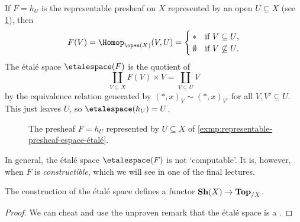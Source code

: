 \begin{exmp}\label{exmp:representable-presheaf-espace-étalé}
If $F = h_U$ is the representable presheaf on $X$ represented by an open $U\subseteq X$ (see \cref{fig:presheaf-represented-by-U}), then
\[ F(V) = \Hom[\open(X)](V,U) = \begin{cases}
    \terminal & \text{if } V\subseteq U\text{,} \\
    \emptyset & \text{if } V\not\subseteq U\text{.}
\end{cases}\]
The étalé space $\etalespace(F)$ is the quotient of
\[ \coprod_{V\subseteq X} F(V)\times V = \coprod_{V\subseteq U} V \]
by the equivalence relation generated by $(*,x)_V\sim(*,x)_{V'}$ for all $V,V'\subseteq U$.
This just leaves $U$, so $\etalespace(h_U) = U$.
\end{exmp}

\begin{figure}
    \centering
    \caption{The presheaf $F = h_U$ represented by $U\subseteq X$ of \cref{exmp:representable-presheaf-espace-étalé}.}
    \label{fig:presheaf-represented-by-U}
\end{figure}

\begin{rmk}
In general, the étalé space $\etalespace(F)$ is not `computable'.
It is, however, when $F$ is \emph{constructible}, which we will see in one of the final lectures.
\end{rmk}

\begin{prop}
    The construction of the étalé space defines a functor
    $\operatorname{\mathbf{Sh}}(X) \to \mathbf{Top}_{/X}$.
\end{prop}
\begin{proof}
    We can cheat and use the unproven remark that the étalé space is a . 
\end{proof}
